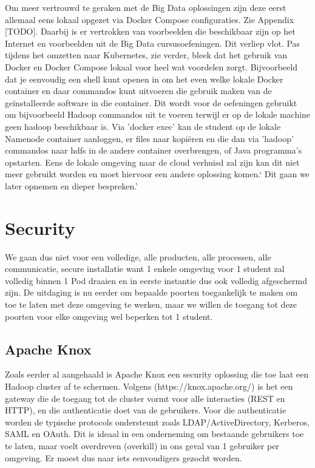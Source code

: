 Om meer vertrouwd te geraken met de Big Data oplossingen zijn deze eerst allemaal eens lokaal opgezet via Docker Compose configuraties. Zie Appendix [TODO].
Daarbij is er vertrokken van voorbeelden die beschikbaar zijn op het Internet en voorbeelden uit de Big Data cursusoefeningen.
\newline
\newline
Dit verliep vlot. Pas tijdens het omzetten naar Kubernetes, zie verder, bleek dat het gebruik van Docker en Docker Compose lokaal voor heel wat voordelen zorgt. Bijvoorbeeld dat je eenvoudig een shell kunt openen in om het even welke lokale Docker container en daar commandos kunt uitvoeren die gebruik maken van de geïnstalleerde software in die container. Dit wordt voor de oefeningen gebruikt om bijvoorbeeld Hadoop commandos uit te voeren terwijl er op de lokale machine geen hadoop beschikbaar is. Via 'docker exec' kan de student op de lokale Namenode container aanloggen, er files naar kopiëren en die dan via 'hadoop' commandos naar hdfs in de andere container overbrengen, of Java programma's opstarten.
Eens de lokale omgeving naar de cloud verhuisd zal zijn kan dit niet meer gebruikt worden en moet hiervoor een andere oplossing komen.` Dit gaan we later opnemen en dieper bespreken.'

\section{Security}
We gaan dus niet voor een volledige, alle producten, alle processen, alle communicatie, secure installatie want 1 enkele omgeving voor 1 student zal volledig binnen 1 Pod draaien en in eerste instantie dus ook volledig afgeschermd zijn.
De uitdaging is nu eerder om bepaalde poorten toegankelijk te maken om toe te laten met deze omgeving te werken, maar we willen de toegang tot deze poorten voor elke omgeving wel beperken tot 1 student.

\subsection{Apache Knox}
Zoals eerder al aangehaald is Apache Knox een security oplossing die toe laat een Hadoop cluster af te schermen.
Volgens (https://knox.apache.org/) is het een gateway die de toegang tot de cluster vormt voor alle interacties (REST en HTTP), en die authenticatie doet van de gebruikers. Voor die authenticatie worden de typische protocols ondersteunt zoals LDAP/ActiveDirectory, Kerberos, SAML en OAuth. Dit is ideaal in een onderneming om bestaande gebruikers toe te laten, maar voelt overdreven (overkill) in ons geval van 1 gebruiker per omgeving. Er moest dus naar iets eenvoudigers gezocht worden.

